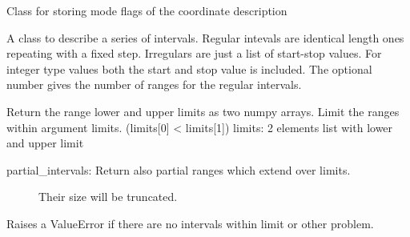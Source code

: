 \documentclass[letterpaper,10pt,english]{sphinxmanual}
\begin{document}

\begin{fulllineitems}
\label{\detokenize{coordinate:flap.coordinate.CoordinateMode}}
Class for storing mode flags of the coordinate description

\end{fulllineitems}


\begin{fulllineitems}
\label{\detokenize{coordinate:flap.coordinate.Intervals}}
A class to describe a series of intervals.
Regular intevals are identical length ones repeating with a fixed step.
Irregulars are just a list of start-stop values.
For integer type values both the start and stop value is included.
The optional number gives the number of ranges for the regular intervals.

\begin{fulllineitems}
\label{\detokenize{coordinate:flap.coordinate.Intervals.interval_limits}}
Return the range lower and upper limits as two numpy arrays.
Limit the ranges within argument limits. (limits{[}0{]} \textless{} limits{[}1{]})
limits: 2 elements list with lower and upper limit
\begin{description}
\item[{partial\_intervals: Return also partial ranges which extend over limits.}] \leavevmode
Their size will be truncated.

\end{description}

Raises a ValueError if there are no intervals within  limit or other problem.


\end{fulllineitems}
\end{fulllineitems}
\end{document}
